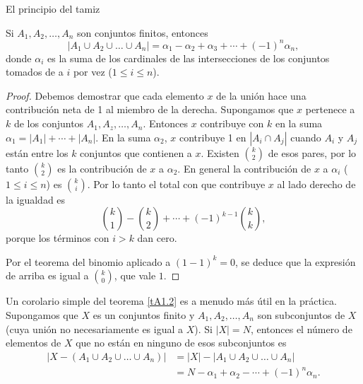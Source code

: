 \begin{section}{El principio del tamiz}
\begin{teorema}\label{tA1.2} Si $A_1,A_2,\ldots,A_n$ son conjuntos finitos, entonces
$$ |A_1 \cup A_2 \cup \ldots \cup A_n|= \alpha_1-\alpha_2+\alpha_3 + \cdots +(-1)^n\alpha_n, $$ donde $\alpha_i$ es la suma de los 
cardinales de las intersecciones de los conjuntos tomados de a $i$ por vez ($1\le i \le n$).
\end{teorema}
\begin{proof} Debemos demostrar que cada elemento $x$ de la unión hace una contribución neta de 1 al miembro de la derecha.
Supongamos que $x$ pertenece a $k$ de los conjuntos $A_1, A_z,\ldots,A_n$. Entonces $x$ contribuye con $k$ en la suma $\alpha_1=|A_1|+\cdots+|A_n|$. En la suma $\alpha_2$, $x$ contribuye 1 en $|A_i \cap A_j|$ cuando $A_i$ y $A_j$ están entre los $k$ conjuntos que contienen a $x$. Existen $\binom{k}{2}$ de esos pares, por lo tanto $\binom{k}{2}$ es la contribución de $x$ a $\alpha_2$. En general la contribución de $x$ a $\alpha_i$ ($1 \le i \le n$) es $\binom{k}{i}$. Por lo tanto el total con que contribuye $x$ al lado derecho de la igualdad es 
$$
\binom{k}{1} -\binom{k}{2} + \cdots + (-1)^{k-1} \binom{k}{k},
$$
porque los términos con $i > k$ dan cero.

Por el teorema del binomio aplicado a $(1-1)^k=0$, se deduce que la expresión de arriba  es igual a
$\binom{k}{0}$, que vale $1$.
\end{proof}

Un corolario simple del teorema \ref{tA1.2} es a menudo más útil en la práctica. Supongamos que $X$ es un conjuntos finito y $A_1,A_2,\ldots,A_n$ son subconjuntos de $X$ (cuya unión no necesariamente es igual a $X$). Si $|X| = N$, entonces el número de elementos de $X$ que no están en ninguno de esos subconjuntos es
$$\begin{aligned}
|X-(A_1 \cup A_2 \cup \ldots \cup A_n)|&=
|X|-|A_1 \cup A_2 \cup \ldots \cup A_n| \\
&= N- \alpha_1 + \alpha_2 - \cdots + (-1)^n\alpha_n.
\end{aligned}
$$





\end{section}

